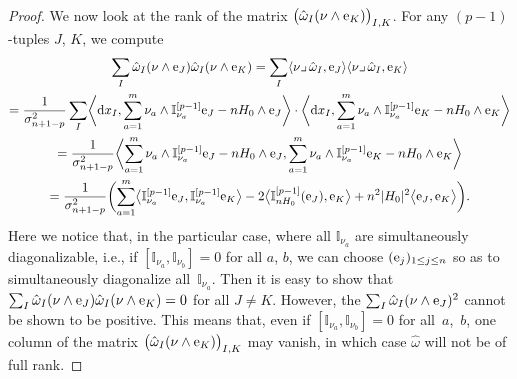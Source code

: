 \begin{proof}
We now look at the rank of the matrix $\bigl(\hat{\omega}_I(\nu\wedge {\rm e}_K)\bigr)_{I,K}$. For any $(p-1)$-tuples $J$, $K$, we compute
\begin{gather*}
\sum_I\hat{\omega}_I(\nu\wedge {\rm e}_J)\hat{\omega}_I(\nu\wedge {\rm e}_K)=\sum_I\langle\nu\lrcorner\,\hat{\omega}_I,{\rm e}_J\rangle\langle\nu\lrcorner\,\hat{\omega}_I,{\rm e}_K\rangle\\
 =\frac{1}{\sigma_{n+1-p}^2}\sum_I \biggl\langle {\rm d}x_I,\sum_{a=1}^m \nu_a\wedge\mathbb{I}_{\nu_a}^{[p-1]}{\rm e}_J-nH_0\wedge {\rm e}_J\biggr\rangle\cdot \biggl\langle {\rm d}x_I,\sum_{a=1}^m \nu_a\wedge\mathbb{I}_{\nu_a}^{[p-1]}{\rm e}_K-nH_0\wedge {\rm e}_K\biggr\rangle\\
 =\frac{1}{\sigma_{n+1-p}^2}\biggl\langle\sum_{a=1}^m \nu_a\wedge\mathbb{I}_{\nu_a}^{[p-1]}{\rm e}_J-nH_0\wedge {\rm e}_J,
\sum_{a=1}^m \nu_a\wedge\mathbb{I}_{\nu_a}^{[p-1]}{\rm e}_K-nH_0\wedge {\rm e}_K\biggr\rangle\\
 =\frac{1}{\sigma_{n+1-p}^2}\biggl(\sum_{a=1}^m\bigl\langle \mathbb{I}_{\nu_a}^{[p-1]}{\rm e}_J,\mathbb{I}_{\nu_a}^{[p-1]}{\rm e}_K\bigr\rangle
-2\bigl\langle\mathbb{I}_{nH_0}^{[p-1]}({\rm e}_J),{\rm e}_K\bigr\rangle+n^2|H_0|^2\bigl\langle {\rm e}_J,{\rm e}_K\bigr\rangle\biggr).
\end{gather*}
Here we notice that, in the particular case, where all $\mathbb{I}_{\nu_a}$ are simultaneously diagonalizable, i.e., if $[\mathbb{I}_{\nu_a},\mathbb{I}_{\nu_b}]=0$ for all $a$, $b$, we can choose $({\rm e}_j)_{1\leq j\leq n}$ so as to simultaneously diagonalize all~$\mathbb{I}_{\nu_a}$.
Then it is easy to show that $\sum_I\hat{\omega}_I(\nu\wedge {\rm e}_J)\hat{\omega}_I(\nu\wedge {\rm e}_K)=0$ for all $J\neq K$.
However, the $\sum_I\hat{\omega}_I(\nu\wedge {\rm e}_J)^2$ cannot be shown to be positive.
This means that, even if $[\mathbb{I}_{\nu_a},\mathbb{I}_{\nu_b}]=0$ for all~$a$,~$b$, one column of the matrix $\bigl(\hat{\omega}_I(\nu\wedge {\rm e}_K)\bigr)_{I,K}$ may vanish, in which case $\hat{\omega}$ will not be of full rank.


\end{proof}
